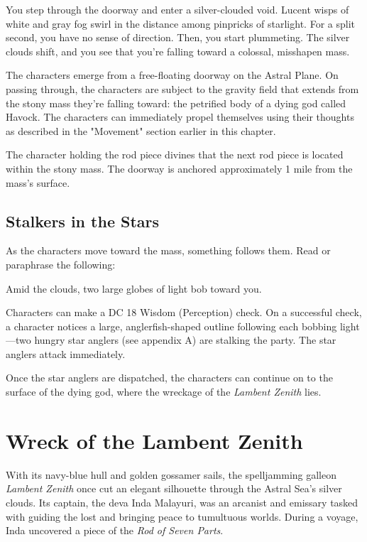 \documentclass[10pt,a4paper,twoside,bg=print,twocolumn,openany,nodeprecatedcode]{dndbook}
\begin{document}
\begin{DndReadAloud}{}
You step through the doorway and enter a silver-clouded void. Lucent wisps of white and gray fog swirl in the distance among pinpricks of starlight. For a split second, you have no sense of direction. Then, you start plummeting. The silver clouds shift, and you see that you're falling toward a colossal, misshapen mass.

\end{DndReadAloud}

The characters emerge from a free-floating doorway on the Astral Plane. On passing through, the characters are subject to the gravity field that extends from the stony mass they're falling toward: the petrified body of a dying god called Havock. The characters can immediately propel themselves using their thoughts as described in the "Movement" section earlier in this chapter.

The character holding the rod piece divines that the next rod piece is located within the stony mass. The doorway is anchored approximately 1 mile from the mass's surface.

\subsection{Stalkers in the Stars}
As the characters move toward the mass, something follows them. Read or paraphrase the following:

\begin{DndReadAloud}{}
Amid the clouds, two large globes of light bob toward you.

\end{DndReadAloud}

Characters can make a DC 18 Wisdom (Perception) check. On a successful check, a character notices a large, anglerfish-shaped outline following each bobbing light—two hungry star anglers (see appendix A) are stalking the party. The star anglers attack immediately.

Once the star anglers are dispatched, the characters can continue on to the surface of the dying god, where the wreckage of the \textit{Lambent Zenith} lies.

\section{Wreck of the Lambent Zenith}
With its navy-blue hull and golden gossamer sails, the spelljamming galleon \textit{Lambent Zenith} once cut an elegant silhouette through the Astral Sea's silver clouds. Its captain, the deva Inda Malayuri, was an arcanist and emissary tasked with guiding the lost and bringing peace to tumultuous worlds. During a voyage, Inda uncovered a piece of the \textit{Rod of Seven Parts}.
\end{document}
